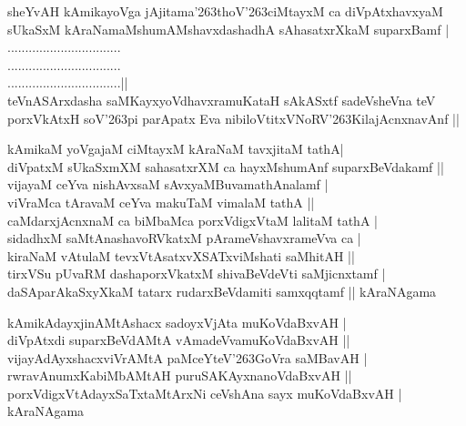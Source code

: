 \begin{entry}
\smallskip
\begin{shl}
sheYvAH kAmikayoVga jAjitama\char'263thoV\char'263ciMtayxM ca diVpAtxhavxyaM\\
sUkaSxM kAraNamaMshumAMshavxdashadhA sAhasatxrXkaM suparxBamf |\\
................................\\
................................\\
................................||\\
teVnASArxdasha saMKayxyoVdhavxramuKataH sAkASxtf sadeVsheVna teV\\
porxVkAtxH soV\char'263pi parApatx Eva nibiloVtitxVNoRV\char'263KilajAcnxnavAnf ||
\end{shl}
\medskip
{}
\smallskip
\begin{shl}
kAmikaM yoVgajaM ciMtayxM kAraNaM tavxjitaM tathA|\\
diVpatxM sUkaSxmXM sahasatxrXM ca hayxMshumAnf suparxBeVdakamf ||\\
vijayaM ceYva nishAvxsaM sAvxyaMBuvamathAnalamf |\\
viVraMca tAravaM ceYva makuTaM vimalaM tathA ||\\
caMdarxjAcnxnaM ca biMbaMca porxVdigxVtaM lalitaM tathA |\\
sidadhxM saMtAnashavoRVkatxM pArameVshavxrameVva ca |\\
kiraNaM vAtulaM tevxVtAsatxvXSATxviMshati saMhitAH ||\\
tirxVSu pUvaRM dashaporxVkatxM shivaBeVdeVti saMjicnxtamf |\\
daSAparAkaSxyXkaM tatarx rudarxBeVdamiti samxqqtamf || kAraNAgama
\end{shl}
\medskip
\begin{shl}
kAmikAdayxjinAMtAshacx sadoyxVjAta muKoVdaBxvAH |\\
diVpAtxdi suparxBeVdAMtA vAmadeVvamuKoVdaBxvAH ||\\
vijayAdAyxshacxviVrAMtA paMceYteV\char'263GoVra saMBavAH |\\
rwravAnumxKabiMbAMtAH puruSAKAyxnanoVdaBxvAH ||\\
porxVdigxVtAdayxSaTxtaMtArxNi ceVshAna sayx muKoVdaBxvAH | kAraNAgama
\end{shl}
\end{entry}

\begin{entry}
\end{entry}

